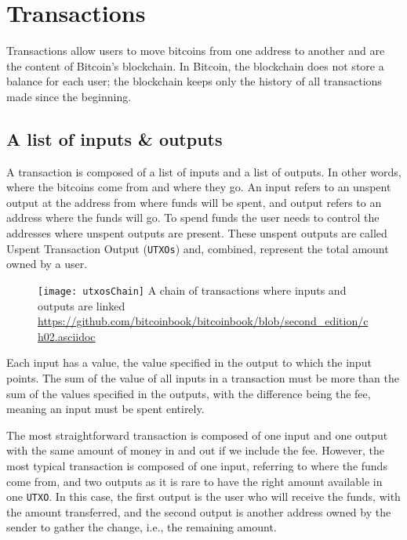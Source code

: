 \section{Transactions}

Transactions allow users to move bitcoins from one address to another and are
the content of  Bitcoin's blockchain. In Bitcoin, the blockchain does
not store a balance for each user; the blockchain keeps only the history of all
transactions made since the beginning.

\subsection{A list of inputs \& outputs}

A transaction is composed of a list of inputs and a list of outputs. In other
words, where the bitcoins come from and where they go. An input refers to an
unspent output at the address from where funds will be spent, and output
refers to an address where the funds will go.  To spend funds the user needs
to control the addresses where unspent outputs are present. These unspent outputs are
called Uspent Transaction Output (\texttt{UTXOs}) and, combined, represent the total amount owned by a user.

\begin{figure}[H]
	\centering
	\texttt{[image: utxosChain]}
  {A chain of transactions where inputs and outputs are linked}
	{\url{https://github.com/bitcoinbook/bitcoinbook/blob/second_edition/ch02.asciidoc}}
	\label{fig:utxosChain}
\end{figure}

Each input has a value, the value specified in the output to which
the input points. The sum of the value of all inputs in a transaction must be more than the
sum of the values specified in the outputs, with the difference being the fee, meaning an input must be spent entirely.

The most straightforward transaction is composed of one input and one output
with the same amount of money in and out if we include the fee. However, the most typical transaction
is composed of one input, referring to where the funds come from, and two
outputs as it is rare to have the right amount available in one
\texttt{UTXO}. In this case, the first output is the user who will receive the funds, with
the amount transferred, and the second output is another address owned by the
sender to gather the change, i.e., the remaining amount.

